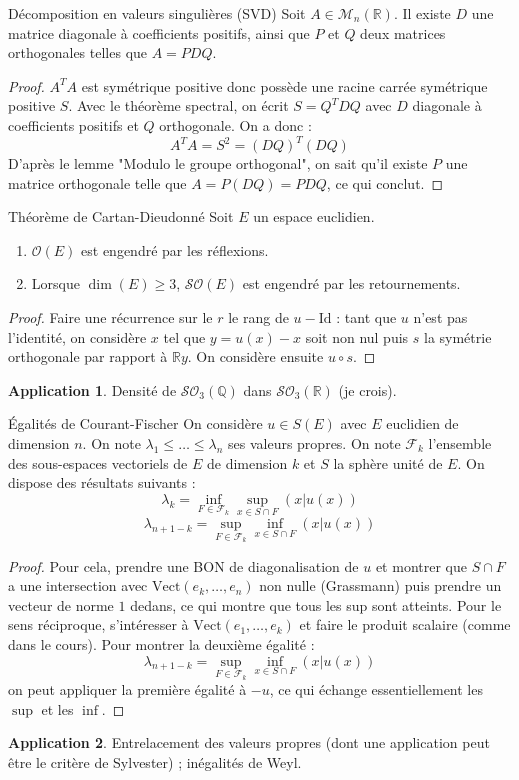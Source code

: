 \documentclass[french]{article}
\newcommand{\Q}{\mathbb{Q}}
\newcommand{\R}{\mathbb{R}}
\theoremstyle{theorem}
\theoremstyle{definition}
\newtheorem*{app}{Application}
\begin{document}
\begin{lem}{Décomposition en valeurs singulières (SVD)}
	Soit $A\in\mathcal{M}_n(\R)$. Il existe $D$ une matrice diagonale à coefficients positifs, ainsi que $P$ et $Q$ deux matrices orthogonales telles que $A=PDQ$.
\end{lem}
\begin{proof}
	$A^TA$ est symétrique positive donc possède une racine carrée symétrique positive $S$. Avec le théorème spectral, on écrit $S=Q^TDQ$ avec $D$ diagonale à coefficients positifs et $Q$ orthogonale. On a donc : $$A^TA=S^2=(DQ)^T(DQ)$$ D'après le lemme "Modulo le groupe orthogonal", on sait qu'il existe $P$ une matrice orthogonale telle que $A=P(DQ)=PDQ$, ce qui conclut.
\end{proof}

\begin{lem}{Théorème de Cartan-Dieudonné}
	Soit $E$ un espace euclidien.
	\begin{enumerate}
		\item $\mathcal{O}(E)$ est engendré par les réflexions.
		\item Lorsque $\dim(E)\geqslant 3$, $\mathcal{SO}(E)$ est engendré par les retournements.
	\end{enumerate}
\end{lem}
\begin{proof}
	Faire une récurrence sur le $r$ le rang de $u-\text{Id}$ : tant que $u$ n'est pas l'identité, on considère $x$ tel que $y=u(x)-x$ soit non nul puis $s$ la symétrie orthogonale par rapport à $\R y$. On considère ensuite $u\circ s$.
\end{proof}
\begin{app}
	Densité de $\mathcal{SO}_3(\Q)$ dans $\mathcal{SO}_3(\R)$ (je crois).
\end{app}

\begin{lem}{Égalités de Courant-Fischer}
	On considère $u\in S(E)$ avec $E$ euclidien de dimension $n$. On note $\lambda_1\leqslant\ldots\leqslant\lambda_n$ ses valeurs propres. On note $\mathcal{F}_k$ l'ensemble des sous-espaces vectoriels de $E$ de dimension $k$ et $S$ la sphère unité de $E$. On dispose des résultats suivants : $$\lambda_k=\inf_{F\in\mathcal{F}_k}\sup_{x\in S\cap F}(x|u(x))$$ $$\lambda_{n+1-k}=\sup_{F\in\mathcal{F}_k}\inf_{x\in S\cap F}(x|u(x))$$
\end{lem}
\begin{proof}
	Pour cela, prendre une BON de diagonalisation de $u$ et montrer que $S\cap F$ a une intersection avec $\text{Vect}(e_k,\ldots,e_n)$ non nulle (Grassmann) puis prendre un vecteur de norme $1$ dedans, ce qui montre que tous les sup sont atteints. Pour le sens réciproque, s'intéresser à $\text{Vect}(e_1,\ldots,e_k)$ et faire le produit scalaire (comme dans le cours). Pour montrer la deuxième égalité : $$\lambda_{n+1-k}=\sup_{F\in \mathcal{F}_k}\inf_{x\in S\cap F}(x|u(x))$$ on peut appliquer la première égalité à $-u$, ce qui échange essentiellement les $\sup$ et les $\inf$.
\end{proof}
\begin{app}
	Entrelacement des valeurs propres (dont une application peut être le critère de Sylvester) ; inégalités de Weyl.
\end{app}
\end{document}
